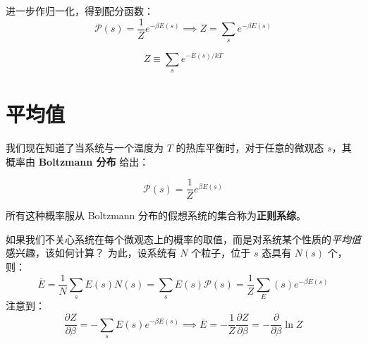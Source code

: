 进一步作归一化，得到配分函数：
\begin{equation}
    \mathcal{P}(s)=\frac{1}{Z}e^{-\beta E(s)} \implies Z=\sum_s e^{-\beta E(s)}
\end{equation}

\begin{definition}[配分函数]
    \begin{equation}
        Z \equiv \sum_s e^{-E(s)/kT}
    \end{equation}
\end{definition}


\section{平均值}
我们现在知道了当系统与一个温度为 $T$ 的热库平衡时，对于任意的微观态 $s$，其概率由 \textbf{Boltzmann 分布} 给出：
\begin{definition}[Boltzmann 分布]
    \begin{equation}
        \mathcal{P}(s) = \frac{1}{Z} e^{\beta E(s)}
    \end{equation}
\end{definition}
所有这种概率服从 Boltzmann 分布的假想系统的集合称为\textbf{正则系综}。

如果我们不关心系统在每个微观态上的概率的取值，而是对系统某个性质的\textit{平均值}感兴趣，该如何计算？ 为此，设系统有 $N$ 个粒子，位于 $s$ 态具有 $N(s)$ 个，则：
\begin{equation}
    \overline E
    =\frac{1}{N}\sum_s E(s)N(s)
    =\sum_s E(s)\mathcal{P}(s)
    =\frac{1}{Z}\sum_ E(s)e^{-\beta E(s)}
\end{equation}
注意到：
\begin{equation}
    \frac{\partial Z}{\partial \beta}=-\sum_s E(s)e^{-\beta E(s)}
    \implies \overline E=-\frac{1}{Z}\frac{\partial Z}{\partial \beta}
    =-\frac{\partial}{\partial \beta}\ln Z
\end{equation}

